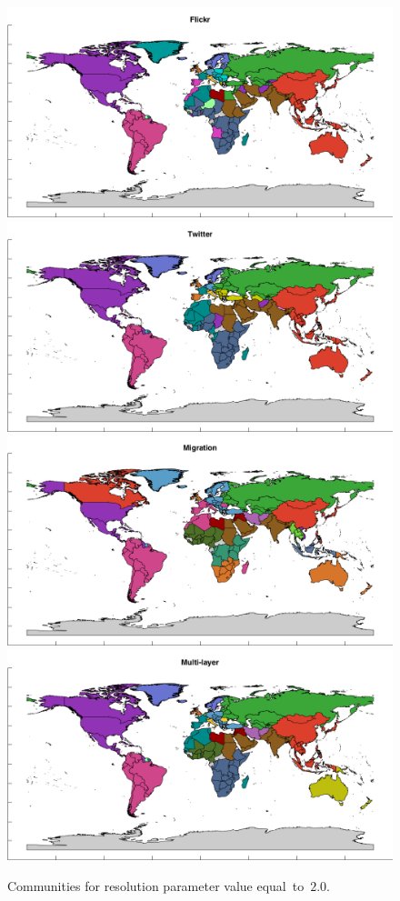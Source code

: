 \documentclass[aps,superscriptaddress,showkeys,nofootinbib]{revtex4-1}
\begin{document}
\begin{figure}[h!]
\centering
\includegraphics[width=.49\textwidth]{partitioning_Flickr_a=20.png}
\includegraphics[width=.49\textwidth]{partitioning_Twitter_a=20.png}
\includegraphics[width=.49\textwidth]{partitioning_Migration_a=20.png}
\includegraphics[width=.49\textwidth]{partitioning_Multi-layer_a=20.png}
\caption{\label{fig::partitioning20}Communities for resolution parameter value equal~to~$2.0$.}
\end{figure}
\end{document}
